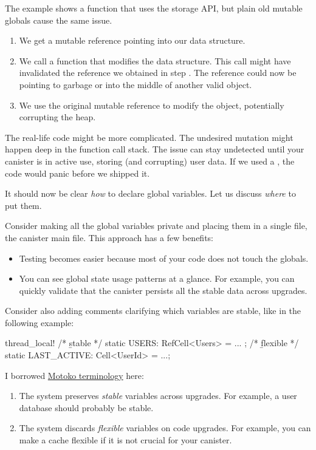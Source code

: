\documentclass{article}
\begin{document}
The example shows a function that uses the storage API, but plain old mutable globals cause the same issue.
\begin{enumerate}
\item We get a mutable reference pointing into our data structure.
\item
  We call a function that modifies the data structure.
  This call might have invalidated the reference we obtained in step .
  The reference could now be pointing to garbage or into the middle of another valid object.
\item
  We use the original mutable reference to modify the object, potentially corrupting the heap.
\end{enumerate}

The real-life code might be more complicated.
The undesired mutation might happen deep in the function call stack.
The issue can stay undetected until your canister is in active use, storing (and corrupting) user data.
If we used a , the code would panic before we shipped it.

It should now be clear \emph{how} to declare global variables.
Let us discuss \emph{where} to put them.


Consider making all the global variables private and placing them in a single file, the canister main file.
This approach has a few benefits:

\begin{itemize}
 \item Testing becomes easier because most of your code does not touch the globals.
 \item
   You can see global state usage patterns at a glance.
   For example, you can quickly validate that the canister persists all the stable data across upgrades.
\end{itemize}

Consider also adding comments clarifying which variables are stable, like in the following example:

\begin{code}[good]
thread_local! {
    /* \b{stable}    */ static USERS: RefCell<Users> = ... ;
    /* \b{flexible}  */ static LAST_ACTIVE: Cell<UserId> = ...;
}
\end{code}

I borrowed \href{https://sdk.dfinity.org/docs/language-guide/upgrades.html#_declaring_stable_variables}{Motoko terminology} here:
\begin{enumerate}
  \item
    The system preserves \emph{stable} variables across upgrades.
    For example, a user database should probably be stable.
  \item
    The system discards \emph{flexible} variables on code upgrades.
    For example, you can make a cache flexible if it is not crucial for your canister.
\end{enumerate}
\end{document}
